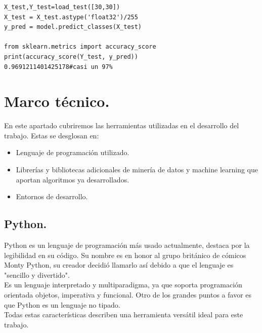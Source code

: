 \documentclass[a4paper,11pt]{article}
\begin{document}
\begin{lstlisting}
X_test,Y_test=load_test([30,30])
X_test = X_test.astype('float32')/255 
y_pred = model.predict_classes(X_test)

from sklearn.metrics import accuracy_score
print(accuracy_score(Y_test, y_pred))
0.9691211401425178#casi un 97%
\end{lstlisting}
\newpage

\section{Marco técnico.}
En este apartado cubriremos las herramientas utilizadas en el desarrollo del trabajo. Estas se desglosan en:
\begin{itemize}
\item Lenguaje de programación utilizado.
\item Librerías y bibliotecas adicionales de minería de datos y machine learning que aportan algoritmos ya desarrollados.
\item Entornos  de desarrollo.
\end{itemize}
\subsection{Python.}
Python es un lenguaje de programación	más usado actualmente, destaca por la legibilidad en su código. Su nombre es en honor al grupo británico de cómicos Monty Python, su creador decidió llamarlo así debido a que el lenguaje es "sencillo y divertido".\\

\noindent
Es un lenguaje interpretado y  multiparadigma, ya que soporta programación orientada objetos, imperativa y funcional. Otro de los grandes puntos a favor es que Python es un lenguaje no tipado.\\

\noindent
Todas estas características describen una herramienta versátil ideal para este trabajo. 
\end{document}
